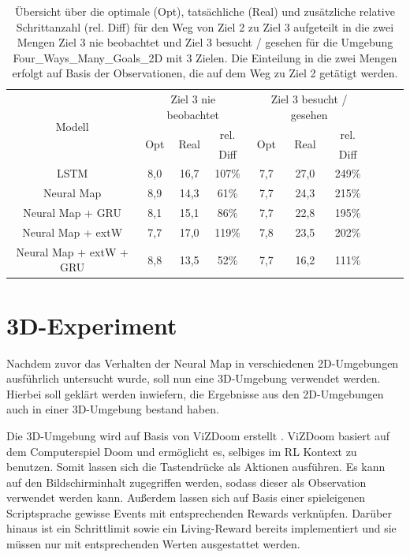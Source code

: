 \begin{table}
  \begin{tabular}{|c|c|c|c|c|c|c|c|c|c|}
    \hline
    \multirow{3}{*}{Modell} & \multicolumn{3}{|c|}{Ziel 3 nie beobachtet} & \multicolumn{3}{|c|}{Ziel 3 besucht / gesehen} \\ \cline{2-7}
    & \multirow{2}{*}{Opt} & \multirow{2}{*}{Real} & rel. & \multirow{2}{*}{Opt} & \multirow{2}{*}{Real} & rel. \\
    & & & Diff & & & Diff \\ \hline
    LSTM & 8,0 & 16,7 & 107\% & 7,7 & 27,0 & 249\% \\ \hline
    Neural Map & 8,9 & 14,3 & 61\% & 7,7 & 24,3 & 215\% \\ \hline
    Neural Map + GRU & 8,1 & 15,1 & 86\% & 7,7 & 22,8 & 195\% \\ \hline
    Neural Map + extW & 7,7 & 17,0 & 119\% & 7,8 & 23,5 & 202\% \\ \hline
    Neural Map + extW + GRU & 8,8 & 13,5 & 52\% & 7,7 & 16,2 & 111\% \\ \hline
  \end{tabular}
  \caption{Übersicht über die optimale (Opt), tatsächliche (Real) und zusätzliche relative Schrittanzahl (rel. Diff) für den Weg von Ziel 2 zu Ziel 3 aufgeteilt in die zwei Mengen \glqq Ziel 3 nie beobachtet\grqq{} und \glqq Ziel 3 besucht / gesehen\grqq{} für die Umgebung \glqq Four\_Ways\_Many\_Goals\_2D\grqq{} mit 3 Zielen. Die Einteilung in die zwei Mengen erfolgt auf Basis der Observationen, die auf dem Weg zu Ziel 2 getätigt werden.}
  \label{results_fw3g_2_to_3_per_M}
\end{table}


\section{3D-Experiment}
\label{sec_3d_exp}

Nachdem zuvor das Verhalten der Neural Map in verschiedenen 2D-Umgebungen ausführlich untersucht wurde, soll nun eine 3D-Umgebung verwendet werden. Hierbei soll geklärt werden inwiefern, die Ergebnisse aus den 2D-Umgebungen auch in einer 3D-Umgebung bestand haben.

Die 3D-Umgebung wird auf Basis von ViZDoom erstellt \cite{VizDoom}. ViZDoom basiert auf dem Computerspiel Doom und ermöglicht es, selbiges im RL Kontext zu benutzen. Somit lassen sich die Tastendrücke als Aktionen ausführen. Es kann auf den Bildschirminhalt zugegriffen werden, sodass dieser als Observation verwendet werden kann. Außerdem lassen sich auf Basis einer spieleigenen Scriptsprache gewisse Events mit entsprechenden Rewards verknüpfen. Darüber hinaus ist ein Schrittlimit sowie ein Living-Reward bereits implementiert und sie müssen nur mit entsprechenden Werten ausgestattet werden.

